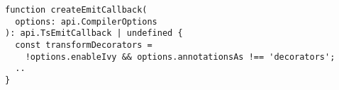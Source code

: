 \begin{verbatim}
function createEmitCallback(
  options: api.CompilerOptions
): api.TsEmitCallback | undefined {
  const transformDecorators =
    !options.enableIvy && options.annotationsAs !== 'decorators';
  ..
}
\end{verbatim}
